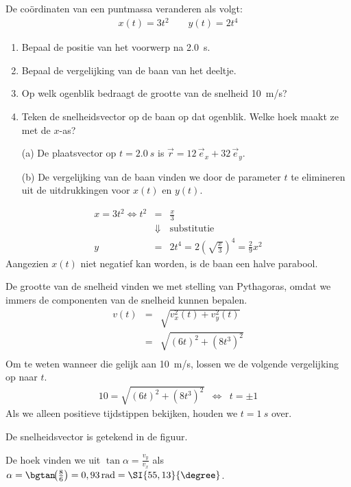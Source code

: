 \documentclass{ximera}
\begin{document}
\begin{exercise}
	De coördinaten van een puntmassa veranderen als volgt:
	\begin{eqnarray*}
		x(t)=3t^2\qquad y(t)=2t^4
	\end{eqnarray*}
	\begin{enumerate}
		\item Bepaal de positie van het voorwerp na \SI{2,0}{s}.%
		\item Bepaal de vergelijking van de baan van het deeltje.
		\item Op welk ogenblik bedraagt de grootte van de snelheid \SI{10}{m/s}?
		\item Teken de snelheidsvector op de baan op dat ogenblik. Welke hoek maakt ze met de $x$-as?
	\end{enumerate}
	\begin{oplossing}
	\begin{itemize}
		\item[(a)] De plaatsvector op $t=\SI{2,0}{s}$ is $\vec{r}=12\,\vec{e}_x+32\,\vec{e}_y$.
		\item[(b)] De vergelijking van de baan vinden we door de parameter $t$ te elimineren uit de uitdrukkingen voor $x(t)$ en $y(t)$.
	\end{itemize}
	\begin{eqnarray*}
		x=3t^2\Leftrightarrow t^2&=&\frac{x}{3}\\
		&\Downarrow&\mathrm{substitutie}\\
		y&=&2t^4=2\left(\sqrt{\frac{x}{3}}\right)^4=\frac{2}{9}x^2
	\end{eqnarray*}
	Aangezien $x(t)$ niet negatief kan worden, is de baan een halve parabool.

	De grootte van de snelheid vinden we met stelling van Pythagoras, omdat we immers de componenten van de snelheid kunnen bepalen.
	\begin{eqnarray*}
		v(t)&=&\sqrt{v_x^2(t)+v_y^2(t)}\\
		&=&\sqrt{(6t)^2+\left(8t^3\right)^2}\\
	\end{eqnarray*}
	Om te weten wanneer die gelijk aan \SI{10}{m/s}, lossen we de volgende vergelijking op naar $t$.
	\begin{eqnarray*}
		10=\sqrt{(6t)^2+\left(8t^3\right)^2}&\Leftrightarrow&t=\pm 1
	\end{eqnarray*}
	Als we alleen positieve tijdstippen bekijken, houden we $t=\SI{1}{s}$ over. 

	De snelheidsvector is getekend in de figuur.

	De hoek vinden we uit $\tan\alpha=\frac{v_y}{v_x}$ als $\alpha=\bgtan\!{\left(\frac{8}{6}\right)}=0,93\rm\,rad=\SI{55,13}{\degree}$.
	\end{oplossing}
\end{exercise}
\end{document}
